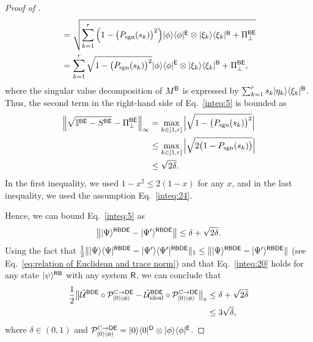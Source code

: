 \begin{proof}[Proof of ]
\begin{align}
    &= \sqrt{\sum_{k=1}^r\Big(1-\big(P_{\mathrm{sgn}}(s_k)\big)^2\Big)|\phi\rangle\langle\phi|^{\mathsf{E}}\otimes|\xi_k\rangle\langle\xi_k|^{\mathsf{B}} + \Pi_\perp^{{\mathsf{B}}{\mathsf{E}}}} \\
    \label{inteq:4}
    &= \sum_{k=1}^r\sqrt{1-\big(P_{\mathrm{sgn}}(s_k)\big)^2}|\phi\rangle\langle\phi|^{\mathsf{E}}\otimes|\xi_k\rangle\langle\xi_k|^{{\mathsf{B}}} + \Pi_\perp^{{\mathsf{B}}{\mathsf{E}}},
\end{align}
where the singular value decomposition of $M^{\mathsf{B}}$ is expressed by $\sum_{k=1}^{r}s_k|\eta_k\rangle\langle\xi_k|^{\mathsf{B}}$.
Thus, the second term in the right-hand side of Eq.~\eqref{inteq:5} is bounded as 
\begin{align}
    \Big\|\sqrt{\mathbb{I}^{{\mathsf{B}}{\mathsf{E}}} -S^{{\mathsf{B}}{\mathsf{E}}}} - \Pi_\perp^{{\mathsf{B}}{\mathsf{E}}}\Big\|_\infty 
    &=\max_{k \in [1, r]}\Big|\sqrt{1-\big(P_{\mathrm{sgn}}(s_k)\big)^2}\Big| \\
    &\leq\max_{k \in [1, r]}\Big|\sqrt{2\big(1-P_{\mathrm{sgn}}(s_k)\big)}\Big| \\
    &\leq \sqrt{2\delta}.
\end{align}
In the first inequality, we used $1-x^2 \leq 2(1-x)$ for any $x$, and in the last inequality, we used the assumption Eq.~\eqref{inteq:24}.


Hence, we can bound Eq.~\eqref{inteq:5} as
\begin{equation}
\label{inteq:20}
    \big\||\Psi\rangle^{{\mathsf{R}}{\mathsf{B}}{\mathsf{D}}{\mathsf{E}}} - |\Psi'\rangle^{{\mathsf{R}}{\mathsf{B}}{\mathsf{D}}{\mathsf{E}}}\big\| \leq \delta + \sqrt{2\delta}.
\end{equation}
Using the fact that $\frac{1}{2}\||\Psi\rangle\langle\Psi|^{{\mathsf{R}}{\mathsf{B}}{\mathsf{D}}{\mathsf{E}}} - |\Psi'\rangle\langle\Psi'|^{{\mathsf{R}}{\mathsf{B}}{\mathsf{D}}{\mathsf{E}}}\|_1 \leq \||\Psi\rangle^{{\mathsf{R}}{\mathsf{B}}{\mathsf{D}}{\mathsf{E}}} - |\Psi'\rangle^{{\mathsf{R}}{\mathsf{B}}{\mathsf{D}}{\mathsf{E}}}\|$ (see Eq.~\eqref{eq:relation of Euclidean and trace norm}) and that Eq.~\eqref{inteq:20} holds for any state $|\psi\rangle^{{\mathsf{R}}{\mathsf{B}}}$ with any system ${\mathsf{R}}$, we can conclude that
\begin{align}
    \frac{1}{2}\big\|\tilde{{\mathcal{U}}}^{{\mathsf{B}}{\mathsf{D}}{\mathsf{E}}} \circ {\mathcal{P}}_{|0\rangle|\phi\rangle}^{\mathbb{C}\rightarrow{\mathsf{D}}{\mathsf{E}}} - \tilde{{\mathcal{U}}}_{\rm ideal}^{{\mathsf{B}}{\mathsf{D}}{\mathsf{E}}} \circ {\mathcal{P}}_{|0\rangle|\phi\rangle}^{\mathbb{C}\rightarrow{\mathsf{D}}{\mathsf{E}}}\big\|_\diamond &\leq \delta + \sqrt{2\delta} \\
    \label{inteq:15}
    &\leq 3\sqrt{\delta},
\end{align}
where $\delta \in (0, 1)$ and ${\mathcal{P}}_{|0\rangle|\phi\rangle}^{\mathbb{C}\rightarrow{\mathsf{D}}{\mathsf{E}}} = |0\rangle\langle0|^{\mathsf{D}} \otimes |\phi\rangle\langle\phi|^{\mathsf{E}}$.

\end{proof}

